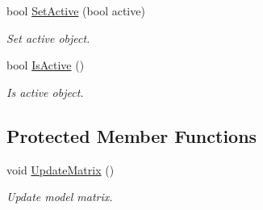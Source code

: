\begin{DoxyCompactItemize}
bool \hyperlink{class_object_ab1946453ecbf12a897ba6a363704cd86}{Set\+Active} (bool active)
\begin{DoxyCompactList}\small\item\em Set active object. \end{DoxyCompactList}\item 
bool \hyperlink{class_object_a49327b515f7e613c882f33c2b058ab98}{Is\+Active} ()
\begin{DoxyCompactList}\small\item\em Is active object. \end{DoxyCompactList}\end{DoxyCompactItemize}
\subsection*{Protected Member Functions}
\begin{DoxyCompactItemize}
\item 
void \hyperlink{class_object_af08c7cf7a01b230d6967551c52bdff63}{Update\+Matrix} ()
\begin{DoxyCompactList}\small\item\em Update model matrix. \end{DoxyCompactList}\end{DoxyCompactItemize}
